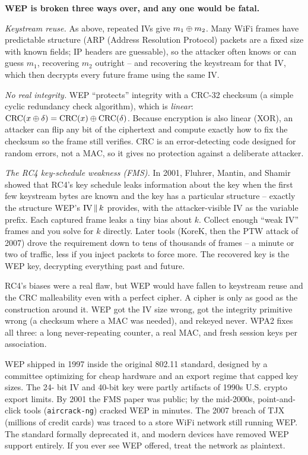\begin{attackbox}
\textbf{WEP is broken three ways over, and any one would be fatal.}

\emph{Keystream reuse.} As above, repeated IVs give $m_1 \oplus m_2$. Many WiFi
frames have predictable structure (ARP (Address Resolution Protocol) packets are a fixed size with known
fields; IP headers are guessable), so the attacker often knows or can guess
$m_1$, recovering $m_2$ outright -- and recovering the keystream for that IV,
which then decrypts every future frame using the same IV.

\emph{No real integrity.} WEP ``protects'' integrity with a CRC-32 checksum (a simple cyclic redundancy check algorithm),
which is \emph{linear}: $\operatorname{CRC}(x \oplus \delta) = \operatorname{CRC}(x) \oplus
\operatorname{CRC}(\delta)$. Because encryption is also linear (XOR), an attacker can
flip any bit of the ciphertext and compute exactly how to fix the checksum so the
frame still verifies. CRC is an error-detecting code designed for random
errors, not a MAC, so it gives no protection against a deliberate attacker.

\emph{The RC4 key-schedule weakness (FMS).} In 2001, Fluhrer, Mantin, and Shamir
showed that RC4's key schedule leaks information about the key when the first few
keystream bytes are known and the key has a particular structure -- exactly the
structure WEP's $\text{IV} \,\|\, k$ provides, with the attacker-visible IV as
the variable prefix. Each captured frame leaks a tiny bias about $k$. Collect
enough ``weak IV'' frames and you solve for $k$ directly. Later tools (KoreK,
then the PTW attack of 2007) drove the requirement down to tens of thousands of
frames -- a minute or two of traffic, less if you inject packets to force more.
The recovered key is the WEP key, decrypting everything past and
future.
\end{attackbox}

RC4's biases were a real flaw, but WEP would
have fallen to keystream reuse and the CRC malleability even with a perfect
cipher. A cipher is only as good as the construction around it.
WEP got the IV size wrong, got the integrity primitive wrong (a checksum where a
MAC was needed), and rekeyed never. WPA2 fixes all three: a long never-repeating
counter, a real MAC, and fresh session keys per association.

\begin{historybox}
WEP shipped in 1997 inside the original 802.11 standard, designed by a committee
optimizing for cheap hardware and an export regime that capped key sizes. The 24-
bit IV and 40-bit key were partly artifacts of 1990s U.S. crypto export limits.
By 2001 the FMS paper was public; by the mid-2000s, point-and-click tools
(\texttt{aircrack-ng}) cracked WEP in minutes. The 2007 breach of TJX (millions
of credit cards) was traced to a store WiFi network still running WEP. The
standard formally deprecated it, and modern devices have removed WEP support
entirely. If you ever see WEP offered, treat the network as plaintext.
\end{historybox}


